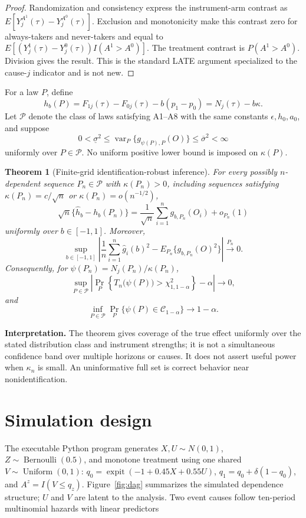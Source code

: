 \documentclass[
  10pt,
  letterpaper,
]{article}
\newtheorem{theorem}{Theorem}
\begin{document}
\begin{proof}
Randomization and consistency express the instrument-arm contrast as
$E[Y_j^{A^1}(\tau)-Y_j^{A^0}(\tau)]$. Exclusion and monotonicity make
this contrast zero for always-takers and never-takers and equal to
$E[(Y_j^1(\tau)-Y_j^0(\tau))I(A^1>A^0)]$. The treatment contrast is
$P(A^1>A^0)$. Division gives the result. This is the standard LATE
argument specialized to the cause-$j$ indicator and is not new.
\end{proof}

For a law $P$, define
\[
h_b(P)=F_{1j}(\tau)-F_{0j}(\tau)-b(p_1-p_0)
      =N_j(\tau)-b\kappa.
\]
Let $\mathcal P$ denote the class of laws satisfying A1--A8 with the
same constants $\epsilon,h_0,a_0$, and suppose
\[
0<\underline\sigma^2
\le \operatorname{var}_P\{g_{\psi(P),P}(O)\}
\le \overline\sigma^2<\infty
\]
uniformly over $P\in\mathcal P$. No uniform positive lower bound is
imposed on $\kappa(P)$.

\begin{theorem}[Finite-grid identification-robust inference]
For every possibly $n$-dependent sequence $P_n\in\mathcal P$ with
$\kappa(P_n)>0$, including sequences satisfying
$\kappa(P_n)=c/\sqrt n$ or $\kappa(P_n)=o(n^{-1/2})$,
\[
\sqrt n\{\widehat h_b-h_b(P_n)\}
=\frac{1}{\sqrt n}\sum_{i=1}^n g_{b,P_n}(O_i)+o_{P_n}(1)
\]
uniformly over $b\in[-1,1]$. Moreover,
\[
\sup_{b\in[-1,1]}
\left|
\frac{1}{n}\sum_{i=1}^n\widehat g_i(b)^2
-E_{P_n}\{g_{b,P_n}(O)^2\}
\right|\xrightarrow{P_n}0.
\]
Consequently, for $\psi(P_n)=N_j(P_n)/\kappa(P_n)$,
\[
\sup_{P\in\mathcal P}
\left|
\Pr_P\!\left\{T_n\bigl(\psi(P)\bigr)
>\chi^2_{1,1-\alpha}\right\}-\alpha
\right|\longrightarrow0,
\]
and
\[
\inf_{P\in\mathcal P}
\Pr_P\{\psi(P)\in\mathcal C_{1-\alpha}\}
\longrightarrow 1-\alpha.
\]
\end{theorem}

\textbf{Interpretation.} The theorem gives coverage of the true effect
uniformly over the stated distribution class and instrument strengths;
it is not a simultaneous confidence band over multiple horizons or
causes. It does not assert useful power
when $\kappa_n$ is small. An uninformative full set is correct behavior
near nonidentification.

\section{Simulation design}

The executable Python program generates $X,U\sim N(0,1)$,
$Z\sim\operatorname{Bernoulli}(0.5)$, and monotone treatment using one
shared $V\sim\operatorname{Uniform}(0,1)$:
$q_0=\operatorname{expit}(-1+0.45X+0.55U)$,
$q_1=q_0+\delta(1-q_0)$, and $A^z=I(V\le q_z)$. Figure~\ref{fig:dag}
summarizes the simulated dependence structure; $U$ and $V$ are latent
to the analysis. Two event causes follow ten-period multinomial hazards
with linear predictors
\end{document}
